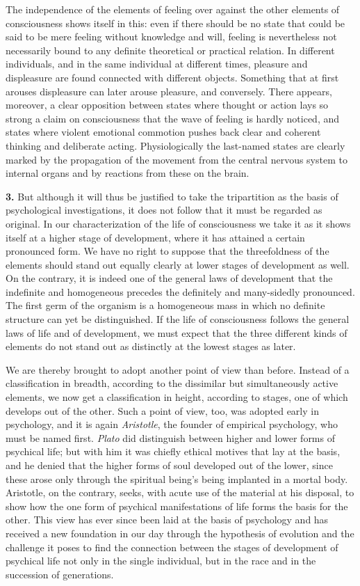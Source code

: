 \documentclass[12pt,a4paper]{book}
\newcommand{\opage}[1]{\marginnote{\footnotesize\textit{[#1]}}}
\begin{document}
The independence of the elements of feeling over against the other
elements of consciousness shows itself in this: even if there should be
no state that could be said to be mere feeling without knowledge and
will, feeling is nevertheless not necessarily bound to any definite
theoretical or practical relation. In different individuals, and in the
same individual at different times, pleasure and displeasure are found
connected with different objects. Something that at first arouses
displeasure can later arouse pleasure, and conversely. There appears,
moreover, a clear opposition between states where thought or action lays
so strong a claim on consciousness that the wave of feeling is hardly
noticed, and states where violent emotional commotion pushes back clear
and coherent thinking and deliberate acting. Physiologically the
last-named states are clearly marked by the propagation of the movement
from the central nervous system to internal organs and by reactions from
these on the brain.

\textbf{3.} But although it will thus be justified to take the
tripartition as the basis of psychological investigations, it does not
follow that it must be regarded as original. In our characterization of
the life of consciousness we take it as it shows itself at a higher stage
of development, where it has attained a certain pronounced form. We have
no right to suppose that the threefoldness of the elements should stand
out equally clearly at lower stages of development as well. On the
contrary, it is indeed one of the general laws of development that the
indefinite and homogeneous precedes the definitely and many-sidedly
pronounced. The first germ of the organism is a homogeneous mass in which
no definite structure can yet be distinguished. If the life of
consciousness follows the general laws of life and of development, we
must expect that the three different kinds of elements do not stand out
as distinctly at the lowest stages as later.


\opage{107}We are thereby brought to adopt another point of view than
before. Instead of a classification in breadth, according to the
dissimilar but simultaneously active elements, we now get a
classification in height, according to stages, one of which develops out
of the other. Such a point of view, too, was adopted early in
psychology, and it is again \emph{Aristotle}, the founder of empirical
psychology, who must be named first. \emph{Plato} did distinguish between
higher and lower forms of psychical life; but with him it was chiefly
ethical motives that lay at the basis, and he denied that the higher
forms of soul developed out of the lower, since these arose only through
the spiritual being's being implanted in a mortal body. Aristotle, on the
contrary, seeks, with acute use of the material at his disposal, to show
how the one form of psychical manifestations of life forms the basis for
the other. This view has ever since been laid at the basis of psychology
and has received a new foundation in our day through the hypothesis of
evolution and the challenge it poses to find the connection between the
stages of development of psychical life not only in the single
individual, but in the race and in the succession of generations.
\end{document}
